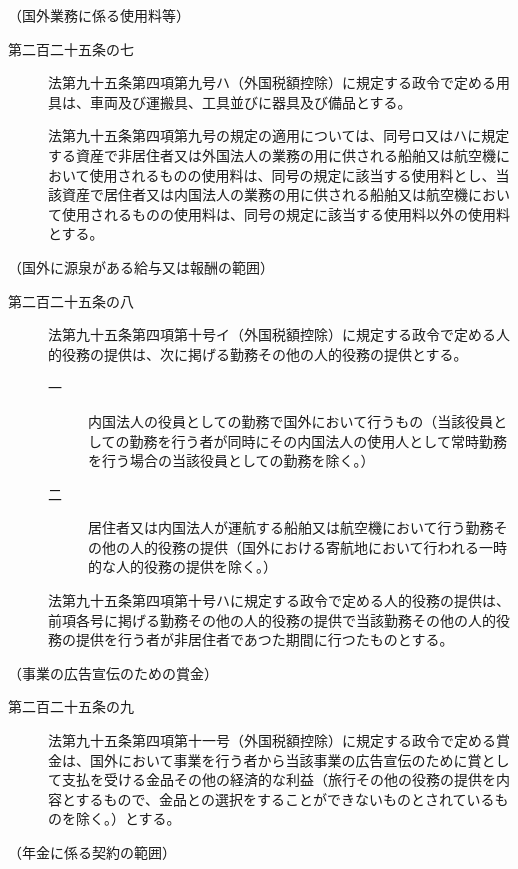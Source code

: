 \documentclass[twocolumn,a4j,10pt]{ltjtarticle}
\begin{document}
\noindent\hspace{10pt}（国外業務に係る使用料等）
\begin{description}
\item[第二百二十五条の七]法第九十五条第四項第九号ハ（外国税額控除）に規定する政令で定める用具は、車両及び運搬具、工具並びに器具及び備品とする。
\item[]法第九十五条第四項第九号の規定の適用については、同号ロ又はハに規定する資産で非居住者又は外国法人の業務の用に供される船舶又は航空機において使用されるものの使用料は、同号の規定に該当する使用料とし、当該資産で居住者又は内国法人の業務の用に供される船舶又は航空機において使用されるものの使用料は、同号の規定に該当する使用料以外の使用料とする。
\end{description}
\noindent\hspace{10pt}（国外に源泉がある給与又は報酬の範囲）
\begin{description}
\item[第二百二十五条の八]法第九十五条第四項第十号イ（外国税額控除）に規定する政令で定める人的役務の提供は、次に掲げる勤務その他の人的役務の提供とする。
\begin{description}
\item[一]内国法人の役員としての勤務で国外において行うもの（当該役員としての勤務を行う者が同時にその内国法人の使用人として常時勤務を行う場合の当該役員としての勤務を除く。）
\item[二]居住者又は内国法人が運航する船舶又は航空機において行う勤務その他の人的役務の提供（国外における寄航地において行われる一時的な人的役務の提供を除く。）
\end{description}
\item[]法第九十五条第四項第十号ハに規定する政令で定める人的役務の提供は、前項各号に掲げる勤務その他の人的役務の提供で当該勤務その他の人的役務の提供を行う者が非居住者であつた期間に行つたものとする。
\end{description}
\noindent\hspace{10pt}（事業の広告宣伝のための賞金）
\begin{description}
\item[第二百二十五条の九]法第九十五条第四項第十一号（外国税額控除）に規定する政令で定める賞金は、国外において事業を行う者から当該事業の広告宣伝のために賞として支払を受ける金品その他の経済的な利益（旅行その他の役務の提供を内容とするもので、金品との選択をすることができないものとされているものを除く。）とする。
\end{description}
\noindent\hspace{10pt}（年金に係る契約の範囲）
\end{document}
